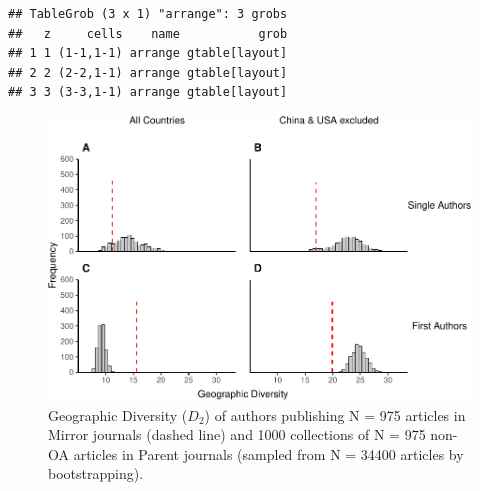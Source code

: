 \documentclass[
  english,
  man]{apa6}
\begin{document}
\begin{verbatim}
## TableGrob (3 x 1) "arrange": 3 grobs
##   z     cells    name           grob
## 1 1 (1-1,1-1) arrange gtable[layout]
## 2 2 (2-2,1-1) arrange gtable[layout]
## 3 3 (3-3,1-1) arrange gtable[layout]
\end{verbatim}

\begin{figure}

{\centering \includegraphics{Smith_etal_APC_ms_files/figure-latex/Fig3-1} 

}

\caption{Geographic Diversity ($D_2$) of authors publishing N =  975  articles in Mirror journals (dashed line) and 1000 collections of N =  975  non-OA articles in Parent journals (sampled from N =  34400  articles by bootstrapping).}\label{fig:Fig3}
\end{figure}
\end{document}
